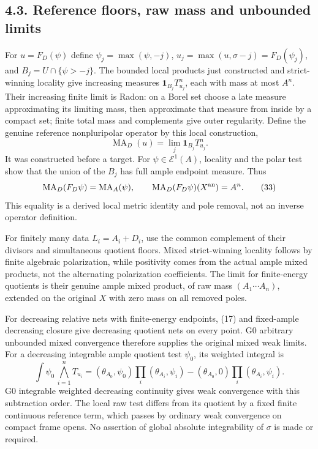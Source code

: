 \documentclass[
  10pt,
]{article}
\begin{document}
\subsection{4.3. Reference floors, raw mass and unbounded
limits}\label{reference-floors-raw-mass-and-unbounded-limits}

For \(u=F_D(\psi)\) define \(\psi_j=\max(\psi,-j)\),
\(u_j=\max(u,\sigma-j)=F_D(\psi_j)\), and \(B_j=U\cap\{\psi>-j\}\). The
bounded local products just constructed and strict-winning locality give
increasing measures \(\mathbf1_{B_j}T_{u_j}^n\), each with mass at most
\(A^n\). Their increasing finite limit is Radon: on a Borel set choose a
late measure approximating its limiting mass, then approximate that
measure from inside by a compact set; finite total mass and complements
give outer regularity. Define the genuine reference nonpluripolar
operator by this local construction,
\[\operatorname{MA}_D(u)=\lim_j\mathbf1_{B_j}T_{u_j}^n.\tag{32}\] It was
constructed before a target. For \(\psi\in\mathcal E^1(A)\), locality
and the polar test show that the union of the \(B_j\) has full ample
endpoint measure. Thus
\[\operatorname{MA}_D(F_D\psi)=\operatorname{MA}_A(\psi),
\qquad\operatorname{MA}_D(F_D\psi)(X^{\rm an})=A^n.\tag{33}\] This
equality is a derived local metric identity and pole removal, not an
inverse operator definition.

For finitely many data \(L_i=A_i+D_i\), use the common complement of
their divisors and simultaneous quotient floors. Mixed strict-winning
locality follows by finite algebraic polarization, while positivity
comes from the actual ample mixed products, not the alternating
polarization coefficients. The limit for finite-energy quotients is
their genuine ample mixed product, of raw mass \((A_1\cdots A_n)\),
extended on the original \(X\) with zero mass on all removed poles.

For decreasing relative nets with finite-energy endpoints, (17) and
fixed-ample decreasing closure give decreasing quotient nets on every
point. G0 arbitrary unbounded mixed convergence therefore supplies the
original mixed weak limits. For a decreasing integrable ample quotient
test \(\psi_0\), its weighted integral is
\[\int\psi_0\,\bigwedge_{i=1}^n T_{u_i}
=(\theta_{A_0},\psi_0)\prod_i(\theta_{A_i},\psi_i)
 -(\theta_{A_0},0)\prod_i(\theta_{A_i},\psi_i).\tag{34}\] G0 integrable
weighted decreasing continuity gives weak convergence with this
subtraction order. The local raw test differs from its quotient by a
fixed finite continuous reference term, which passes by ordinary weak
convergence on compact frame opens. No assertion of global absolute
integrability of \(\sigma\) is made or required.
\end{document}
